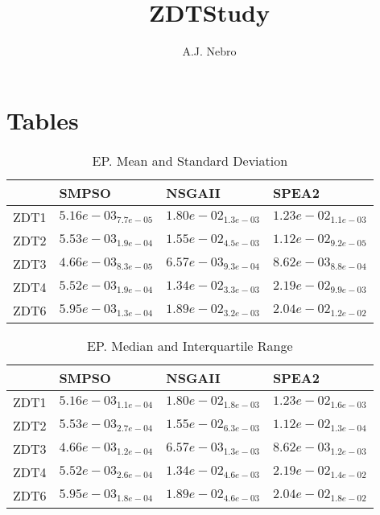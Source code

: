 \documentclass{article}
\title{ZDTStudy}
\author{A.J. Nebro}
\begin{document}
\maketitle
\section{Tables}

\begin{table}
\caption{EP. Mean and Standard Deviation}
\label{table: EP}
\centering
\begin{scriptsize}
\begin{tabular}{llll}
\hline & SMPSO & NSGAII &  SPEA2\\
\hline 
ZDT1 & \cellcolor{gray95}$  5.16e-03_{ 7.7e-05}$ & $  1.80e-02_{ 1.3e-03}$ & \cellcolor{gray25}$  1.23e-02_{ 1.1e-03}$ \\
ZDT2 & \cellcolor{gray95}$  5.53e-03_{ 1.9e-04}$ & $  1.55e-02_{ 4.5e-03}$ & \cellcolor{gray25}$  1.12e-02_{ 9.2e-05}$ \\
ZDT3 & \cellcolor{gray95}$  4.66e-03_{ 8.3e-05}$ & \cellcolor{gray25}$  6.57e-03_{ 9.3e-04}$ & $  8.62e-03_{ 8.8e-04}$ \\
ZDT4 & \cellcolor{gray95}$  5.52e-03_{ 1.9e-04}$ & \cellcolor{gray25}$  1.34e-02_{ 3.3e-03}$ & $  2.19e-02_{ 9.9e-03}$ \\
ZDT6 & \cellcolor{gray95}$  5.95e-03_{ 1.3e-04}$ & \cellcolor{gray25}$  1.89e-02_{ 3.2e-03}$ & $  2.04e-02_{ 1.2e-02}$ \\
\hline
\end{tabular}
\end{scriptsize}
\end{table}

\begin{table}
\caption{EP. Median and Interquartile Range}
\label{table: EP}
\centering
\begin{scriptsize}
\begin{tabular}{llll}
\hline & SMPSO & NSGAII &  SPEA2\\
\hline 
ZDT1 & \cellcolor{gray95}$  5.16e-03_{ 1.1e-04}$ & $  1.80e-02_{ 1.8e-03}$ & \cellcolor{gray25}$  1.23e-02_{ 1.6e-03}$ \\
ZDT2 & \cellcolor{gray95}$  5.53e-03_{ 2.7e-04}$ & $  1.55e-02_{ 6.3e-03}$ & \cellcolor{gray25}$  1.12e-02_{ 1.3e-04}$ \\
ZDT3 & \cellcolor{gray95}$  4.66e-03_{ 1.2e-04}$ & \cellcolor{gray25}$  6.57e-03_{ 1.3e-03}$ & $  8.62e-03_{ 1.2e-03}$ \\
ZDT4 & \cellcolor{gray95}$  5.52e-03_{ 2.6e-04}$ & \cellcolor{gray25}$  1.34e-02_{ 4.6e-03}$ & $  2.19e-02_{ 1.4e-02}$ \\
ZDT6 & \cellcolor{gray95}$  5.95e-03_{ 1.8e-04}$ & \cellcolor{gray25}$  1.89e-02_{ 4.6e-03}$ & $  2.04e-02_{ 1.8e-02}$ \\
\hline
\end{tabular}
\end{scriptsize}
\end{table}
\end{document}
